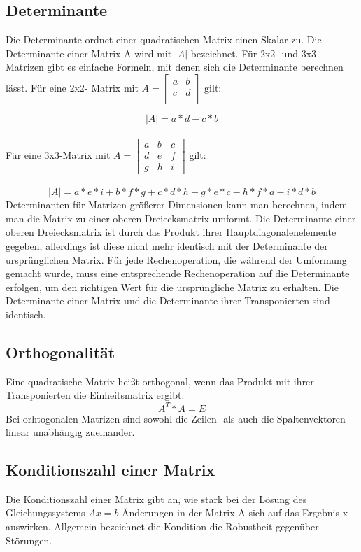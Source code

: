 \documentclass[11pt]{scrreprt}
\begin{document}
\subsection{Determinante}
Die Determinante ordnet einer quadratischen Matrix einen Skalar zu. Die Determinante einer Matrix A wird mit $|A|$ bezeichnet.
Für 2x2- und 3x3- Matrizen gibt es einfache Formeln, mit denen sich die Determinante berechnen lässt. Für eine 2x2- Matrix mit $
A =
\begin{bmatrix}
a & b \\
c & d \\
\end{bmatrix}
$ gilt:

\begin{equation}
|A| = a*d - c*b
\end {equation}
\\
Für eine 3x3-Matrix mit $
A = 
\begin{bmatrix}
a & b & c \\
d & e & f \\
g & h & i
\end{bmatrix}
$  gilt:
\\
\\
\begin {equation}
|A| = a*e*i + b*f*g + c*d*h - g*e*c - h*f*a - i*d*b
\end {equation}
Determinanten für Matrizen größerer Dimensionen kann man berechnen, indem man die Matrix zu einer oberen Dreiecksmatrix umformt. Die Determinante einer oberen Dreiecksmatrix ist durch das Produkt ihrer Hauptdiagonalenelemente gegeben, allerdings ist diese nicht mehr identisch mit der Determinante der ursprünglichen Matrix. Für jede Rechenoperation, die während der Umformung gemacht wurde, muss eine entsprechende Rechenoperation auf die Determinante erfolgen, um den richtigen Wert für die ursprüngliche Matrix zu erhalten.
Die Determinante einer Matrix und die Determinante ihrer Transponierten sind identisch.
\subsection{Orthogonalität}
Eine quadratische Matrix heißt orthogonal, wenn das Produkt mit ihrer Transponierten die Einheitsmatrix ergibt:
\begin{equation}
A^T * A = E
\end{equation}
Bei orhtogonalen Matrizen sind sowohl die Zeilen- als  auch die Spaltenvektoren linear unabhängig zueinander.
\subsection{Konditionszahl einer Matrix}
Die Konditionszahl einer Matrix gibt an, wie stark bei der Lösung des Gleichungssystems $Ax=b$ Änderungen in der Matrix A sich auf das Ergebnis x auswirken. Allgemein bezeichnet die Kondition die Robustheit gegenüber Störungen.
\end{document}
